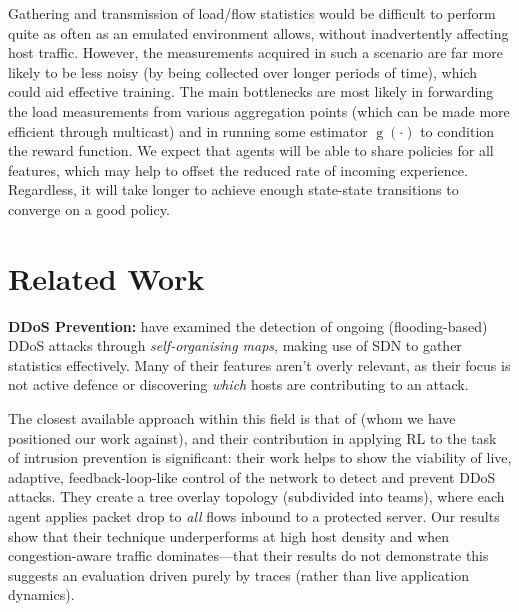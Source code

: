 \documentclass[10pt, times, comsoc]{IEEEtran}
\newcommand{\fakepara}[1]{\noindent\textbf{#1:}}
\begin{document}
Gathering and transmission of load/flow statistics would be difficult to perform quite as often as an emulated environment allows, without inadvertently affecting host traffic.
However, the measurements acquired in such a scenario are far more likely to be less noisy (by being collected over longer periods of time), which could aid effective training.
The main bottlenecks are most likely in forwarding the load measurements from various aggregation points (which can be made more efficient through multicast) and in running some estimator $\operatorname{g}(\cdot)$ to condition the reward function.
We expect that agents will be able to share policies for all features, which may help to offset the reduced rate of incoming experience.
Regardless, it will take longer to achieve enough state-state transitions to converge on a good policy.

\section{Related Work}\label{sec:related-work}


\fakepara{DDoS Prevention}
\Textcite{DBLP:conf/lcn/BragaMP10} have examined the detection of ongoing (flooding-based) DDoS attacks through \emph{self-organising maps}, making use of SDN to gather statistics effectively.
Many of their features aren't overly relevant, as their focus is not active defence or discovering \emph{which} hosts are contributing to an attack.

The closest available approach within this field is that of \textcite{DBLP:journals/eaai/MalialisK15} (whom we have positioned our work against), and their contribution in applying RL to the task of intrusion prevention is significant: their work helps to show the viability of live, adaptive, feedback-loop-like control of the network to detect and prevent DDoS attacks.
They create a tree overlay topology (subdivided into teams), where each agent applies packet drop to \emph{all} flows inbound to a protected server.
Our results show that their technique underperforms at high host density and when congestion-aware traffic dominates---that their results do not demonstrate this suggests an evaluation driven purely by traces (rather than live application dynamics).
\end{document}
